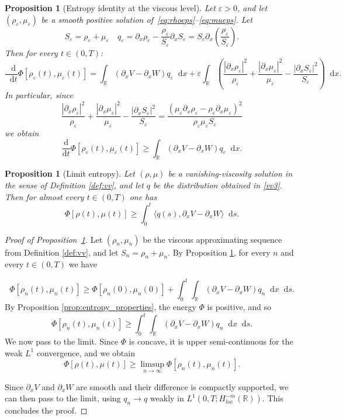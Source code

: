 \documentclass[a4paper,twosided, 11pt]{article}
\newcommand{\eps}{\varepsilon}
\newcommand{\R}{\mathbb{R}}
\theoremstyle{plain}
\newtheorem{proposition}[thm]{Proposition}
\theoremstyle{remark}
\newcommand{\diff}{\mathop{} \mathrm{d}}
\numberwithin{equation}{section}
\begin{document}
\begin{proposition}[Entropy identity at the viscous level]\label{prop:entropy-viscous}
Let $\eps>0$, and let $(\rho_\eps, \mu_\eps)$ be a smooth positive solution of~\eqref{eq:rhoeps}--\eqref{eq:mueps}. Let 
$$
S_\eps= \rho_\eps + \mu_\eps \quad q_\eps = \partial_x\rho_\eps-\frac{\rho_\eps}{S_\eps}\partial_xS_\eps
=S_\eps \partial_x \left(\frac{\rho_\eps}{S_\eps}\right).
$$    
Then for every $t\in(0,T)$: 
\begin{equation*}
\frac{\diff}{\diff t}\Phi[\rho_\eps(t),\mu_\eps(t)]
=
\int_{\R}(\partial_x V-\partial_x W)q_\eps\diff  x
+\eps\int_{\R}\left(\frac{|\partial_x\rho_\eps|^2}{\rho_\eps}
+\frac{|\partial_x\mu_\eps|^2}{\mu_\eps}
-\frac{|\partial_xS_\eps|^2}{S_\eps}\right)\diff  x.
\end{equation*}
In particular, since
$$
\frac{|\partial_x\rho_\eps|^2}{\rho_\eps}
+\frac{|\partial_x\mu_\eps|^2}{\mu_\eps}
-\frac{|\partial_xS_\eps|^2}{S_\eps} = \frac{\left(\mu_\eps\partial_x \rho_\eps - \rho_\eps\partial_x\mu_\eps\right)^2}{\rho_\eps\mu_\eps S_\eps}
$$
we obtain
\begin{equation*}
\frac{\mathrm{d}}{\mathrm{d}t}\Phi[\rho_\eps(t),\mu_\eps(t)] 
\ge \int_{\R}(\partial_x V-\partial_x W)q_\eps\diff  x .
\end{equation*}
\end{proposition}

\begin{proposition}[Limit entropy]
\label{prop:limit-entropy}
Let $(\rho,\mu)$ be a vanishing-viscosity solution in the sense of Definition \ref{def:vv}, and let $q$ be the distribution obtained in \ref{vv3}. Then for almost every $t\in(0,T)$ one has
$$
\Phi[\rho(t),\mu(t)]\ge \int_0^t \langle q(s),\partial_x V-\partial_x W\rangle\diff  s.
$$
\end{proposition}

\begin{proof}[Proof of Proposition~\ref{prop:limit-entropy}]
Let $(\rho_n,\mu_n)$ be the viscous approximating sequence from Definition \ref{def:vv}, and let $S_n=\rho_n+\mu_n$. By Proposition \ref{prop:entropy-viscous}, for every $n$ and every $t\in(0,T)$ we have

\begin{equation*}
\Phi[\rho_n(t),\mu_n(t)]
\ge \Phi[\rho_n(0),\mu_n(0)]
+\int_0^t \int_{\R}(\partial_x V-\partial_x W)q_n\diff  x\diff  s.
\end{equation*}
By Proposition \ref{prop:entropy_properties}, the energy $\Phi$ is positive, and so
\begin{equation*}
\Phi[\rho_n(t),\mu_n(t)]
\ge \int_0^t \int_{\R}(\partial_x V-\partial_x W)q_n\diff  x\diff  s.
\end{equation*}
We now pass to the limit. Since $\Phi$ is concave, it is upper semi-continuous for the weak $L^1$ convergence, and we obtain
$$
\Phi[\rho(t),\mu(t)]\ge \limsup_{n\to\infty}\Phi[\rho_n(t),\mu_n(t)].
$$

Since $\partial_xV$ and $\partial_xW$ are smooth and their difference is compactly supported, we can then pass to the limit, using $q_n\to q$ weakly in $L^1(0,T; H^{-m}_{loc}(\R))$. This concludes the proof.
\end{proof}
\end{document}
